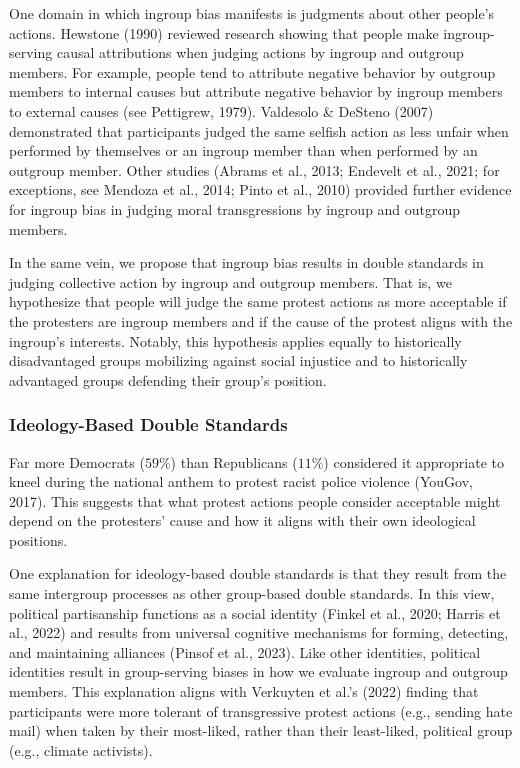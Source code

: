 \documentclass[12pt, letterpaper]{article}
\begin{document}
One domain in which ingroup bias manifests is judgments about other
people's actions. Hewstone (1990) reviewed research showing that people
make ingroup-serving causal attributions when judging actions by ingroup
and outgroup members. For example, people tend to attribute negative
behavior by outgroup members to internal causes but attribute negative
behavior by ingroup members to external causes (see Pettigrew, 1979).
Valdesolo \& DeSteno (2007) demonstrated that participants judged the
same selfish action as less unfair when performed by themselves or an
ingroup member than when performed by an outgroup member. Other studies
(Abrams et al., 2013; Endevelt et al., 2021; for exceptions, see Mendoza
et al., 2014; Pinto et al., 2010) provided further evidence for ingroup
bias in judging moral transgressions by ingroup and outgroup members.

In the same vein, we propose that ingroup bias results in double
standards in judging collective action by ingroup and outgroup members.
That is, we hypothesize that people will judge the same protest actions
as more acceptable if the protesters are ingroup members and if the
cause of the protest aligns with the ingroup's interests. Notably, this
hypothesis applies equally to historically disadvantaged groups
mobilizing against social injustice and to historically advantaged
groups defending their group's position.

\hypertarget{ideology-based-double-standards}{%
\subsubsection{Ideology-Based Double
Standards}\label{ideology-based-double-standards}}

Far more Democrats (\(59\%\)) than Republicans (\(11\%\)) considered it
appropriate to kneel during the national anthem to protest racist police
violence (YouGov, 2017). This suggests that what protest actions people
consider acceptable might depend on the protesters' cause and how it
aligns with their own ideological positions.

One explanation for ideology-based double standards is that they result
from the same intergroup processes as other group-based double
standards. In this view, political partisanship functions as a social
identity (Finkel et al., 2020; Harris et al., 2022) and results from
universal cognitive mechanisms for forming, detecting, and maintaining
alliances (Pinsof et al., 2023). Like other identities, political
identities result in group-serving biases in how we evaluate ingroup and
outgroup members. This explanation aligns with Verkuyten et al.'s (2022)
finding that participants were more tolerant of transgressive protest
actions (e.g., sending hate mail) when taken by their most-liked, rather
than their least-liked, political group (e.g., climate activists).
\end{document}
